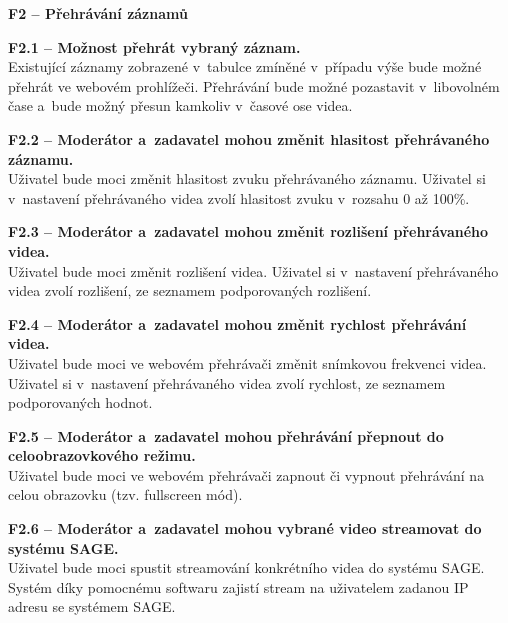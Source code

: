 \documentclass[thesis=M,czech]{FITthesis}[2012/06/26]
\begin{document}
\begin{description}
  \item \textbf{F2 -- Přehrávání záznamů}
  \begin{description}
    \item \textbf{F2.1 -- Možnost přehrát vybraný záznam.\\}
    Existující záznamy zobrazené v~tabulce zmíněné v~případu výše bude možné přehrát ve webovém prohlížeči. Přehrávání bude možné pozastavit v~libovolném čase a~bude možný přesun kamkoliv v~časové ose videa.
    \item \textbf{F2.2 -- Moderátor a~zadavatel mohou změnit hlasitost přehrávaného záznamu.\\}
	Uživatel bude moci změnit hlasitost zvuku přehrávaného záznamu. Uživatel si v~nastavení přehrávaného videa zvolí hlasitost zvuku v~rozsahu 0 až 100\%.
    \item \textbf{F2.3 -- Moderátor a~zadavatel mohou změnit rozlišení přehrávaného videa.\\}
    Uživatel bude moci změnit rozlišení videa. Uživatel si v~nastavení přehrávaného videa zvolí rozlišení, ze seznamem podporovaných rozlišení.
    \item \textbf{F2.4 -- Moderátor a~zadavatel mohou změnit rychlost přehrávání videa.\\}
    Uživatel bude moci ve webovém přehrávači změnit snímkovou frekvenci videa. Uživatel si v~nastavení přehrávaného videa zvolí rychlost, ze seznamem podporovaných hodnot.
    \item \textbf{F2.5 -- Moderátor a~zadavatel mohou přehrávání přepnout do celoobrazovkového režimu.\\}
    Uživatel bude moci ve webovém přehrávači zapnout či vypnout přehrávání na celou obrazovku (tzv. fullscreen mód).
    \item \textbf{F2.6 -- Moderátor a~zadavatel mohou vybrané video streamovat do systému SAGE.\\}
	Uživatel bude moci spustit streamování konkrétního videa do systému SAGE. Systém díky pomocnému softwaru zajistí stream na uživatelem zadanou IP adresu se systémem SAGE.
  \end{description}


\end{description}
\end{document}
